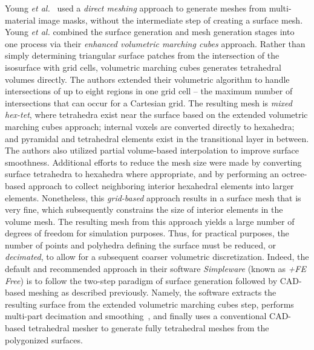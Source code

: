  Young \textit{et al.}~\cite{young_2008} used a \textit{direct meshing} approach to generate meshes from multi-material image masks, without the intermediate step of creating a surface mesh. Young \textit{et al.} combined the surface generation and mesh generation stages into one process via their \textit{enhanced volumetric marching cubes} approach. Rather than simply determining triangular surface patches from the intersection of the isosurface with grid cells, volumetric marching cubes generates tetrahedral volumes directly. The authors extended their volumetric algorithm to handle intersections of up to eight regions in one grid cell -- the maximum number of intersections that can occur for a Cartesian grid. The resulting mesh is \textit{mixed hex-tet}, where tetrahedra exist near the surface based on the extended volumetric marching cubes approach; internal voxels are converted directly to hexahedra; and pyramidal and tetrahedral elements exist in the transitional layer in between. The authors also utilized partial volume-based interpolation to improve surface smoothness. Additional efforts to reduce the mesh size were made by converting surface tetrahedra to hexahedra where appropriate, and by performing an octree-based approach to collect neighboring interior hexahedral elements into larger elements. Nonetheless, this \textit{grid-based} approach results in a surface mesh that is very fine, which subsequently constrains the size of interior elements in the volume mesh. The resulting mesh from this approach yields a large number of degrees of freedom for simulation purposes. Thus, for practical purposes, the number of points and polyhedra defining the surface must be reduced, or \textit{decimated}, to allow for a subsequent coarser volumetric discretization. Indeed, the default and recommended approach in their software \textit{Simpleware} (known as \textit{+FE Free}) is to follow the two-step paradigm of surface generation followed by CAD-based meshing as described previously. Namely, the software extracts the resulting surface from the extended volumetric marching cubes step, performs multi-part decimation and smoothing~\cite{egst}, and finally uses a conventional CAD-based tetrahedral mesher to generate fully tetrahedral meshes from the polygonized surfaces.
 
 


